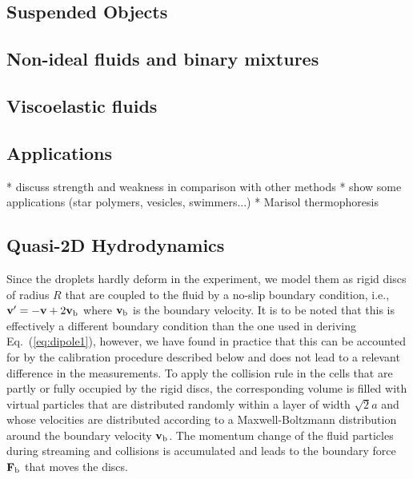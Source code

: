 \documentclass[8.5pt,twoside,twocolumn]{article}
\renewcommand{\vec}[1]{{\ensuremath{\mathchoice
                     {\mbox{\boldmath$\displaystyle\mathbf{#1}$}}
                     {\mbox{\boldmath$\textstyle\mathbf{#1}$}}
                     {\mbox{\boldmath$\scriptstyle\mathbf{#1}$}}
                     {\mbox{\boldmath$\scriptscriptstyle\mathbf{#1}$}}}}}%
\newcommand{\vvec}{\ensuremath{\vec{v}}}
\begin{document}
\subsection{Suspended Objects}
\subsection{Non-ideal fluids and binary mixtures}
\subsection{Viscoelastic fluids}
\subsection{Applications}

* discuss strength and weakness in comparison with other methods
* show some applications (star polymers, vesicles, swimmers...)
* Marisol thermophoresis

\subsection{Quasi-2D Hydrodynamics}

Since the droplets hardly deform in the experiment, we model them as
rigid discs of radius $R$ that are coupled to the fluid by a no-slip
boundary condition, i.e., $\vvec' = -\vvec + 2\vvec_\text{b}$ where
$\vvec_\text{b}$ is the boundary velocity. It is to be noted that this
is effectively a different boundary condition than the one used in
deriving Eq.~(\ref{eq:dipole1}), however, we have found in practice
that this can be accounted for by the calibration procedure described
below and does not lead to a relevant difference in the
measurements. To apply the collision rule in the cells that are partly
or fully occupied by the rigid discs, the corresponding volume is
filled with virtual particles that are distributed randomly within a
layer of width $\sqrt{2}a$ and whose velocities are distributed
according to a Maxwell-Boltzmann distribution around the boundary
velocity $\vvec_\text{b}$.\cite{Goetze2007} The momentum change of the
fluid particles during streaming and collisions is accumulated and
leads to the boundary force $\vec{F}_\text{b}$ that moves the
discs.\cite{Goetze2011}
\end{document}
